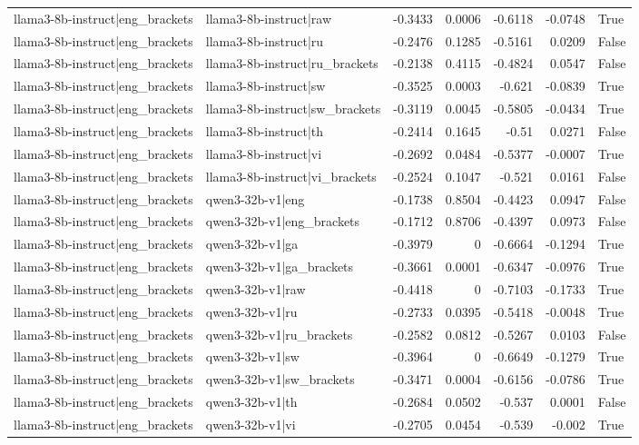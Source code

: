 \begin{table}
\begin{tabular}{l l r r r r l}
llama3-8b-instruct|eng_brackets & llama3-8b-instruct|raw & -0.3433 & 0.0006 & -0.6118 & -0.0748 & True \\
llama3-8b-instruct|eng_brackets & llama3-8b-instruct|ru & -0.2476 & 0.1285 & -0.5161 & 0.0209 & False \\
llama3-8b-instruct|eng_brackets & llama3-8b-instruct|ru_brackets & -0.2138 & 0.4115 & -0.4824 & 0.0547 & False \\
llama3-8b-instruct|eng_brackets & llama3-8b-instruct|sw & -0.3525 & 0.0003 & -0.621 & -0.0839 & True \\
llama3-8b-instruct|eng_brackets & llama3-8b-instruct|sw_brackets & -0.3119 & 0.0045 & -0.5805 & -0.0434 & True \\
llama3-8b-instruct|eng_brackets & llama3-8b-instruct|th & -0.2414 & 0.1645 & -0.51 & 0.0271 & False \\
llama3-8b-instruct|eng_brackets & llama3-8b-instruct|vi & -0.2692 & 0.0484 & -0.5377 & -0.0007 & True \\
llama3-8b-instruct|eng_brackets & llama3-8b-instruct|vi_brackets & -0.2524 & 0.1047 & -0.521 & 0.0161 & False \\
llama3-8b-instruct|eng_brackets & qwen3-32b-v1|eng & -0.1738 & 0.8504 & -0.4423 & 0.0947 & False \\
llama3-8b-instruct|eng_brackets & qwen3-32b-v1|eng_brackets & -0.1712 & 0.8706 & -0.4397 & 0.0973 & False \\
llama3-8b-instruct|eng_brackets & qwen3-32b-v1|ga & -0.3979 & 0 & -0.6664 & -0.1294 & True \\
llama3-8b-instruct|eng_brackets & qwen3-32b-v1|ga_brackets & -0.3661 & 0.0001 & -0.6347 & -0.0976 & True \\
llama3-8b-instruct|eng_brackets & qwen3-32b-v1|raw & -0.4418 & 0 & -0.7103 & -0.1733 & True \\
llama3-8b-instruct|eng_brackets & qwen3-32b-v1|ru & -0.2733 & 0.0395 & -0.5418 & -0.0048 & True \\
llama3-8b-instruct|eng_brackets & qwen3-32b-v1|ru_brackets & -0.2582 & 0.0812 & -0.5267 & 0.0103 & False \\
llama3-8b-instruct|eng_brackets & qwen3-32b-v1|sw & -0.3964 & 0 & -0.6649 & -0.1279 & True \\
llama3-8b-instruct|eng_brackets & qwen3-32b-v1|sw_brackets & -0.3471 & 0.0004 & -0.6156 & -0.0786 & True \\
llama3-8b-instruct|eng_brackets & qwen3-32b-v1|th & -0.2684 & 0.0502 & -0.537 & 0.0001 & False \\
llama3-8b-instruct|eng_brackets & qwen3-32b-v1|vi & -0.2705 & 0.0454 & -0.539 & -0.002 & True \\

\end{tabular}
\end{table}
